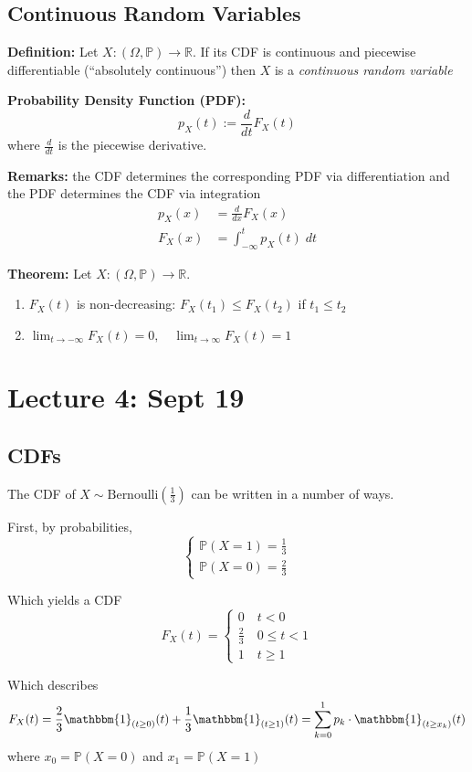 \documentclass[12pt]{article}
\renewcommand{\P}{\mathbb{P}}
\newcommand{\R}{\mathbb{R}}
\newcommand{\ind}{\mathbbm{1}}
\begin{document}
\subsection{Continuous Random Variables}
\textbf{Definition:} Let $X : (\Omega, \P) \to \R$. If its CDF is continuous and piecewise differentiable (``absolutely continuous'') then $X$ is a \emph{continuous random variable}

\textbf{Probability Density Function (PDF):} 
\[p_X(t) := \frac{d}{dt}F_X(t)\]
where $\frac{d}{dt}$ is the piecewise derivative. 

\textbf{Remarks:} the CDF determines the corresponding PDF via differentiation and the PDF determines the CDF via integration
\begin{align*}
    p_X(x) &= \frac{d}{dx} F_X(x)\\
    F_X(x) &= \int_{-\infty}^t p_X(t)\; dt
\end{align*}

\textbf{Theorem:} Let $X : (\Omega, \P) \to \R$. 
\begin{enumerate}
    \item $F_X(t)$ is non-decreasing: $F_X(t_1) \leq F_X(t_2)$ if $t_1 \leq t_2$
    \item $\lim_{t\to -\infty} F_X(t) = 0, \quad \lim_{t\to \infty} F_X(t) = 1$ 
\end{enumerate}

\section{Lecture 4: Sept 19}
\subsection{CDFs}
The CDF of $X \sim \text{Bernoulli}(\frac{1}{3})$ can be written in a number of ways.

First, by probabilities, 
\[\begin{cases}
    \P(X = 1) = \frac{1}{3}\\
    \P(X = 0) = \frac{2}{3}
\end{cases}\]

Which yields a CDF
\[F_X(t) = \begin{cases}
    0 \quad t < 0\\
    \frac{2}{3} \quad 0 \leq t < 1\\
    1 \quad t \geq 1
\end{cases}\]

Which describes
\[F_X(t) = \frac{2}{3} \ind_{(t \geq 0)}(t) + \frac{1}{3}\ind_{(t \geq 1)}(t) = \sum_{k=0}^1 p_k \cdot \ind_{(t\geq x_k)}(t)\]
where $x_0 = \P(X = 0)$ and $x_1 = \P(X = 1)$
\end{document}

